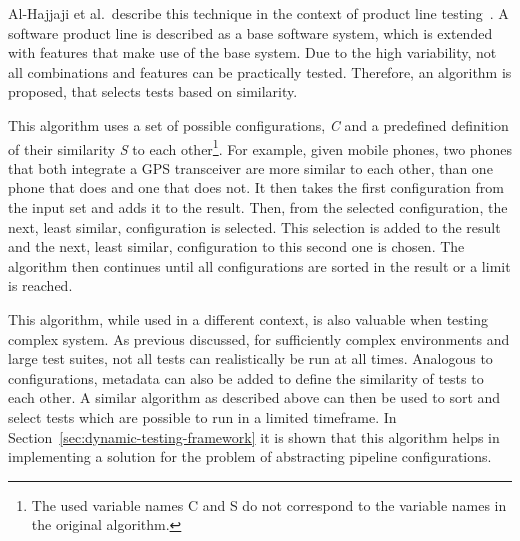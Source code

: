 Al-Hajjaji et al.~describe this technique in the context of product line testing~\cite{SimilarityBasedPrioritizationInSoftwareProductLineTesting}.
A software product line is described as a base software system, which is extended with features that make use of the base system.
Due to the high variability, not all combinations and features can be practically tested.
Therefore, an algorithm is proposed, that selects tests based on similarity.

This algorithm uses a set of possible configurations, \textit{C} and a predefined definition of their similarity \textit{S} to each other\footnote{The used variable names C and S do not correspond to the variable names in the original algorithm.}.
For example, given mobile phones, two phones that both integrate a GPS transceiver are more similar to each other, than one phone that does and one that does not.
It then takes the first configuration from the input set and adds it to the result.
Then, from the selected configuration, the next, least similar, configuration is selected.
This selection is added to the result and the next, least similar, configuration to this second one is chosen.
The algorithm then continues until all configurations are sorted in the result or a limit is reached.

This algorithm, while used in a different context, is also valuable when testing complex system.
As previous discussed, for sufficiently complex environments and large test suites, not all tests can realistically be run at all times.
Analogous to configurations, metadata can also be added to define the similarity of tests to each other.
A similar algorithm as described above can then be used to sort and select tests which are possible to run in a limited timeframe.
In Section~\ref{sec:dynamic-testing-framework} it is shown that this algorithm helps in implementing a solution for the problem of abstracting pipeline configurations.
